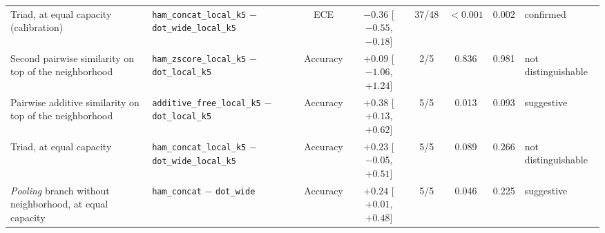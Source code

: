 \begin{table}[!t]
\begin{adjustbox}{max width=\linewidth}
\begin{tabular}{>{\raggedright\arraybackslash}p{4.4cm}lccccc>{\raggedright\arraybackslash}p{1.9cm}}
Triad, at equal capacity (calibration) & \texttt{ham\_concat\_local\_k5} $-$ \texttt{dot\_wide\_local\_k5} & ECE & $-0.36$ [$-0.55$, $-0.18$] & 37/48 & $<0.001$ & 0.002 & confirmed \\
Second pairwise similarity on top of the neighborhood & \texttt{ham\_zscore\_local\_k5} $-$ \texttt{dot\_local\_k5} & Accuracy & $+0.09$ [$-1.06$, $+1.24$] & 2/5 & 0.836 & 0.981 & not distinguishable \\
\midrule
Pairwise additive similarity on top of the neighborhood & \texttt{additive\_free\_local\_k5} $-$ \texttt{dot\_local\_k5} & Accuracy & $+0.38$ [$+0.13$, $+0.62$] & 5/5 & 0.013 & 0.093 & suggestive \\
Triad, at equal capacity & \texttt{ham\_concat\_local\_k5} $-$ \texttt{dot\_wide\_local\_k5} & Accuracy & $+0.23$ [$-0.05$, $+0.51$] & 5/5 & 0.089 & 0.266 & not distinguishable \\
\emph{Pooling} branch without neighborhood, at equal capacity & \texttt{ham\_concat} $-$ \texttt{dot\_wide} & Accuracy & $+0.24$ [$+0.01$, $+0.48$] & 5/5 & 0.046 & 0.225 & suggestive \\
\bottomrule
\end{tabular}
\end{adjustbox}
\end{table}
